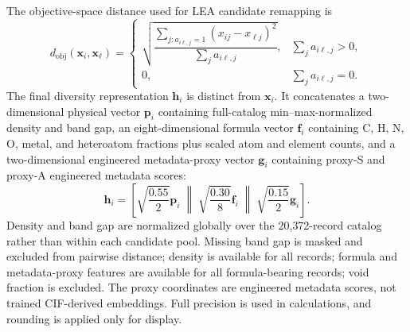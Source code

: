 \documentclass[12pt,a4paper]{article}
\begin{document}
The objective-space distance used for LEA candidate remapping is
\begin{equation}
  d_{\mathrm{obj}}(\mathbf{x}_i,\mathbf{x}_\ell)=
  \begin{cases}
  \sqrt{\dfrac{\sum_{j:a_{i\ell,j}=1}(x_{ij}-x_{\ell j})^2}{\sum_j a_{i\ell,j}}}, & \sum_j a_{i\ell,j}>0,\\[8pt]
  0, & \sum_j a_{i\ell,j}=0.
  \end{cases}
\end{equation}
The final diversity representation $\mathbf{h}_i$ is distinct from $\mathbf{x}_i$. It concatenates a two-dimensional physical vector $\mathbf{p}_i$ containing full-catalog min--max-normalized density and band gap, an eight-dimensional formula vector $\mathbf{f}_i$ containing C, H, N, O, metal, and heteroatom fractions plus scaled atom and element counts, and a two-dimensional engineered metadata-proxy vector $\mathbf{g}_i$ containing proxy-S and proxy-A engineered metadata scores:
\begin{equation}
  \mathbf{h}_i =
  \left[
  \sqrt{\frac{0.55}{2}}\mathbf{p}_i\;\middle\|\;
  \sqrt{\frac{0.30}{8}}\mathbf{f}_i\;\middle\|\;
  \sqrt{\frac{0.15}{2}}\mathbf{g}_i
  \right].
\end{equation}
Density and band gap are normalized globally over the 20{,}372-record catalog rather than within each candidate pool. Missing band gap is masked and excluded from pairwise distance; density is available for all records; formula and metadata-proxy features are available for all formula-bearing records; void fraction is excluded. The proxy coordinates are engineered metadata scores, not trained CIF-derived embeddings. Full precision is used in calculations, and rounding is applied only for display.
\end{document}
